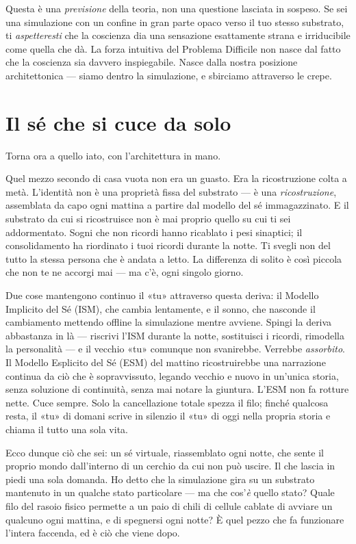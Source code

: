 \documentclass[11pt, twoside, openright]{book}
\begin{document}
Questa è una \textit{previsione} della teoria, non una questione lasciata in sospeso. Se sei una simulazione con un confine in gran parte opaco verso il tuo stesso substrato, ti \textit{aspetteresti} che la coscienza dia una sensazione esattamente strana e irriducibile come quella che dà. La forza intuitiva del Problema Difficile non nasce dal fatto che la coscienza sia davvero inspiegabile. Nasce dalla nostra posizione architettonica --- siamo dentro la simulazione, e sbirciamo attraverso le crepe.

\section*{Il sé che si cuce da solo}

Torna ora a quello iato, con l'architettura in mano.

Quel mezzo secondo di casa vuota non era un guasto. Era la ricostruzione colta a metà. L'identità non è una proprietà fissa del substrato --- è una \textit{ricostruzione}, assemblata da capo ogni mattina a partire dal modello del sé immagazzinato. E il substrato da cui si ricostruisce non è mai proprio quello su cui ti sei addormentato. Sogni che non ricordi hanno ricablato i pesi sinaptici; il consolidamento ha riordinato i tuoi ricordi durante la notte. Ti svegli non del tutto la stessa persona che è andata a letto. La differenza di solito è così piccola che non te ne accorgi mai --- ma c'è, ogni singolo giorno.

Due cose mantengono continuo il «tu» attraverso questa deriva: il Modello Implicito del Sé (ISM), che cambia lentamente, e il sonno, che nasconde il cambiamento mettendo offline la simulazione mentre avviene. Spingi la deriva abbastanza in là --- riscrivi l'ISM durante la notte, sostituisci i ricordi, rimodella la personalità --- e il vecchio «tu» comunque non svanirebbe. Verrebbe \textit{assorbito}. Il Modello Esplicito del Sé (ESM) del mattino ricostruirebbe una narrazione continua da ciò che è sopravvissuto, legando vecchio e nuovo in un'unica storia, senza soluzione di continuità, senza mai notare la giuntura. L'ESM non fa rotture nette. Cuce sempre. Solo la cancellazione totale spezza il filo; finché qualcosa resta, il «tu» di domani scrive in silenzio il «tu» di oggi nella propria storia e chiama il tutto una sola vita.

Ecco dunque ciò che sei: un sé virtuale, riassemblato ogni notte, che sente il proprio mondo dall'interno di un cerchio da cui non può uscire. Il che lascia in piedi una sola domanda. Ho detto che la simulazione gira su un substrato mantenuto in un qualche stato particolare --- ma che cos'\textit{è} quello stato? Quale filo del rasoio fisico permette a un paio di chili di cellule cablate di avviare un qualcuno ogni mattina, e di spegnersi ogni notte? È quel pezzo che fa funzionare l'intera faccenda, ed è ciò che viene dopo.
\end{document}
